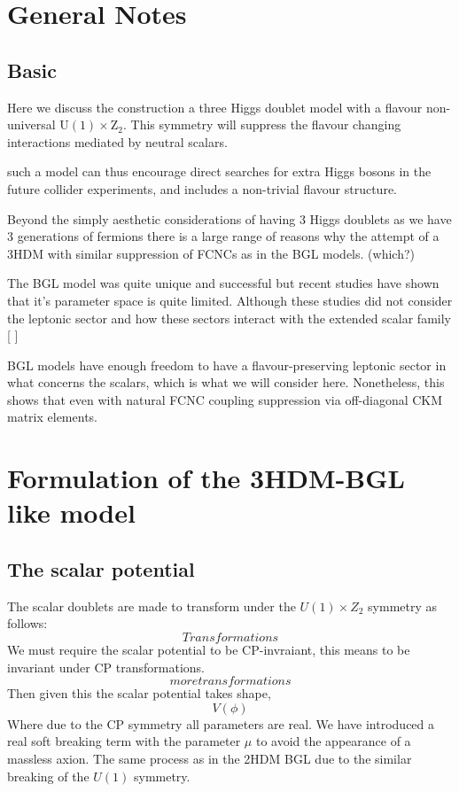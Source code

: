 \section{General Notes}

\subsection{Basic}

Here we discuss the construction a three Higgs doublet model with a flavour non-universal $\mathrm{U(1)}\times\mathrm{Z_2}$. This symmetry will suppress the flavour changing interactions mediated by neutral scalars. 

such a model can thus encourage direct searches for extra Higgs bosons in the future collider experiments, and includes a
non-trivial flavour structure.

Beyond the simply aesthetic considerations of having 3 Higgs doublets as we have 3 generations of fermions there is a large range of reasons why the attempt of a 3HDM with similar suppression of FCNCs as in the BGL models. (which?) 

The BGL model was quite unique and successful but recent studies have shown that it's parameter space is quite limited. Although these studies did not consider the leptonic sector and how these sectors interact with the extended scalar family [
]

BGL models have enough freedom to have a flavour-preserving leptonic sector in what concerns the scalars, which is what we will consider here. Nonetheless, this shows that even with natural FCNC coupling suppression via off-diagonal CKM matrix elements. 

\section{Formulation of the 3HDM-BGL like model}

\subsection{The scalar potential}

The scalar doublets are made to transform under the $U(1) \times Z_2$ symmetry as follows: 
\begin{equation}
Transformations 
\end{equation}
We must require the scalar potential to be CP-invraiant, this means to be invariant under CP transformations. 
\begin{equation}
more transformations
\end{equation}
Then given this the scalar potential takes shape,
\begin{equation}
V(\phi)
\end{equation}
Where due to the CP symmetry all parameters are real. We have introduced a real soft breaking term with the parameter $\mu$ to avoid the appearance of a massless axion. The same process as in the 2HDM BGL due to the similar breaking of the $U(1)$ symmetry. 

